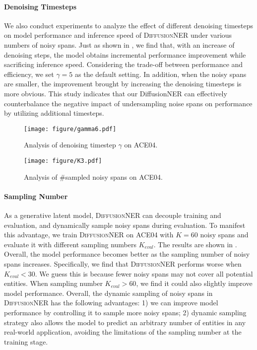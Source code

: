 \documentclass[11pt]{article}
\begin{document}
\paragraph{Denoising Timesteps}
We also conduct experiments to analyze the effect of different denoising timesteps on model performance and inference speed of \textsc{DiffusionNER} under various numbers of noisy spans. Just as shown in , we find that, with an increase of denoising steps, the model obtains incremental performance improvement while sacrificing inference speed. Considering the trade-off between performance and efficiency, we set $\gamma = 5$ as the default setting. In addition, when the noisy spans are smaller, the improvement brought by increasing the denoising timesteps is more obvious. This study indicates that our DiffusionNER can effectively counterbalance the negative impact of undersampling noise spans on performance by utilizing additional timesteps.


\begin{figure}[!htp]
  \centering
\texttt{[image: figure/gamma6.pdf]}
  \caption{Analysis of denoising timestep $\gamma$ on ACE04.}
  \label{fig:gamma}
\end{figure}

\begin{figure}[!htp]
  \centering
  \texttt{[image: figure/K3.pdf]}
  \caption{Analysis of \#sampled noisy spans on ACE04.}
  \label{fig:k}
\end{figure}

\paragraph{Sampling Number} 
As a generative latent model, \textsc{DiffusionNER} can decouple training and evaluation, and dynamically sample noisy spans during evaluation. To manifest this advantage, we train \textsc{DiffusionNER} on ACE04 with $K = 60$ noisy spans and evaluate it with different sampling numbers $K_{eval}$. The results are shown in . Overall, the model performance becomes better as the sampling number of noisy spans increases. Specifically, we find that \textsc{DiffusionNER} performs worse when $K_{eval}<30$. We guess this is because fewer noisy spans may not cover all potential entities. When sampling number $K_{eval}>60$, we find it could also slightly improve model performance. Overall, the dynamic sampling of noisy spans in \textsc{DiffusionNER} has the following advantages: 1) we can improve model performance by controlling it to sample more noisy spans; 2) dynamic sampling strategy also allows the model to predict an arbitrary number of entities in any real-world application, avoiding the limitations of the sampling number at the training stage.
\end{document}
